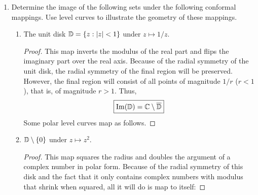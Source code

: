 \documentclass[../psets.tex]{subfiles}
\begin{document}
\begin{enumerate}[ref={A.\arabic*}]
\begin{proof}
        \begin{equation*}
            \int_\gamma\frac{1}{z-a}\dd{z} = 2\pi i
        \end{equation*}
        For the right integral, we can apply the fundamental theorem of calculus. We have that
        \begin{equation*}
            \int_\gamma\frac{1}{z-b}\dd{z} = \int_0^{2\pi}\frac{i\e[it]}{\e[it]-b}\dd{t}
            = \left[ \ln|\e[it]-b| \right]_0^{2\pi}
            = 0
        \end{equation*}
        Therefore, we have that
        \begin{align*}
            \int_\gamma\frac{1}{(z-a)(z-b)}\dd{z} &= \frac{1}{a-b}\left[ \int_\gamma\frac{1}{z-a}\dd{z}-\int_\gamma\frac{1}{z-b}\dd{z} \right]\\
            &= \frac{1}{a-b}[2\pi i-0]\\
            &= \frac{2\pi i}{a-b}
        \end{align*}
        as desired.
    \end{proof}
    \item Determine the image of the following sets under the following conformal mappings. Use level curves to illustrate the geometry of these mappings.
    \begin{enumerate}[ref={A.\theenumi\alph*}]
        \item The unit disk $\mathbb{D}=\{z:|z|<1\}$ under $z\mapsto 1/z$.
        \begin{proof}
            This map inverts the modulus of the real part and flips the imaginary part over the real axis. Because of the radial symmetry of the unit disk, the radial symmetry of the final region will be preserved. However, the final region will consist of all points of magnitude $1/r$ ($r<1$), that is, of magnitude $r>1$. Thus,
            \begin{equation*}
                \boxed{\operatorname{Im}(\mathbb{D}) = \mathbb{C}\setminus\overline{\mathbb{D}}}
            \end{equation*}
            Some polar level curves map as follows.
        \end{proof}
        \item $\mathbb{D}\setminus\{0\}$ under $z\mapsto z^2$.
        \begin{proof}
            This map squares the radius and doubles the argument of a complex number in polar form. Because of the radial symmetry of this disk and the fact that it only contains complex numbers with modulus that shrink when squared, all it will do is map to itself:

\end{proof}
\end{enumerate}
\end{enumerate}
\end{document}
